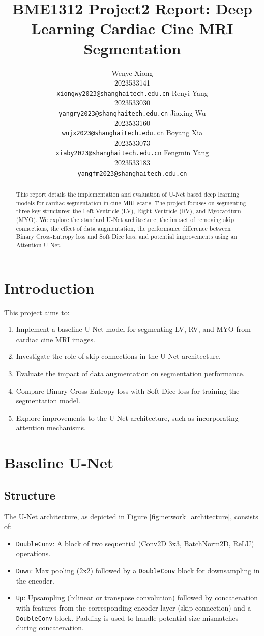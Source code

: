 \documentclass{article}
\title{BME1312 Project2 Report: Deep Learning Cardiac Cine MRI Segmentation}
\author{%
  Wenye Xiong \\
  2023533141 \\
  \texttt{xiongwy2023@shanghaitech.edu.cn}
  \And
  Renyi Yang \\
  2023533030 \\
  \texttt{yangry2023@shanghaitech.edu.cn}
  \AND
  Jiaxing Wu \\
  2023533160 \\
  \texttt{wujx2023@shanghaitech.edu.cn}
  \And
  Boyang Xia \\
  2023533073 \\
  \texttt{xiaby2023@shanghaitech.edu.cn}
  \AND
  Fengmin Yang \\
  2023533183 \\
  \texttt{yangfm2023@shanghaitech.edu.cn}
}
\begin{document}
\maketitle


\begin{abstract}
  This report details the implementation and evaluation of U-Net based deep learning models for cardiac segmentation
  in cine MRI scans. The project focuses on segmenting three key structures: the Left Ventricle (LV), Right Ventricle (RV),
  and Myocardium (MYO). We explore the standard U-Net architecture, the impact of removing skip connections, the effect of
  data augmentation, the performance difference between Binary Cross-Entropy loss and Soft Dice loss, and potential improvements using an Attention U-Net.
\end{abstract}

\section{Introduction}
This project aims to:
\begin{enumerate}
  \item Implement a baseline U-Net model for segmenting LV, RV, and MYO from cardiac cine MRI images.
  \item Investigate the role of skip connections in the U-Net architecture.
  \item Evaluate the impact of data augmentation on segmentation performance.
  \item Compare Binary Cross-Entropy loss with Soft Dice loss for training the segmentation model.
  \item Explore improvements to the U-Net architecture, such as incorporating attention mechanisms.
\end{enumerate}



\section{Baseline U-Net}

\subsection{Structure}
The U-Net architecture, as depicted in Figure \ref{fig:network_architecture}, consists of:
\begin{itemize}
  \item \texttt{DoubleConv}: A block of two sequential (Conv2D 3x3, BatchNorm2D, ReLU) operations.
  \item \texttt{Down}: Max pooling (2x2) followed by a \texttt{DoubleConv} block for downsampling in the encoder.
  \item \texttt{Up}: Upsampling (bilinear or transpose convolution) followed by concatenation with features from the
        corresponding encoder layer (skip connection) and a \texttt{DoubleConv} block. Padding is used to handle potential
        size mismatches during concatenation.
\end{itemize}
\end{document}
